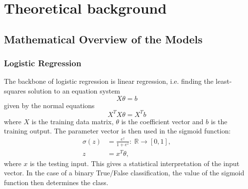 \section{Theoretical background}


\subsection{Mathematical Overview of the Models}
\subsubsection{Logistic Regression}
The backbone of logistic regression is linear regression, i.e. finding the least-squares solution to an equation system \begin{equation}
    X\theta = b
\end{equation}
given by the normal equations \begin{equation}
    X^TX \theta = X^Tb
\end{equation}
where $X$ is the training data matrix, $\theta$ is the coefficient vector and $b$ is the training output. The parameter vector is then used in the sigmoid function: \begin{align}
    \sigma(z) &= \frac{e^{z}}{1+e^{z}}: \; \mathbb{R}\to [0,1],\\
    z &= x^T \theta,
\end{align}
where $x$ is the testing input. This gives a statistical interpretation of the input vector. In the case of a binary True/False classification, the value of the sigmoid function then determines the class.

